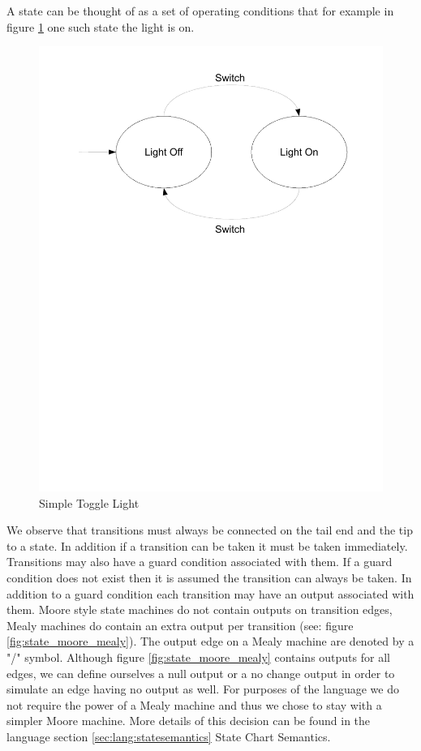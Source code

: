 A state can be thought of as a set of operating conditions that for example in figure \ref{fig:state_blink_light}
one such state the light is on.

\begin{figure}[htp]
    \centering
    \includegraphics[trim= 10mm 150mm 10mm 10mm, clip, width=\imgmedium]{./images/state_blink_light.pdf}
    \caption{Simple Toggle Light}
    \label{fig:state_blink_light}
\end{figure}

We observe that transitions must always be connected on the tail end and the tip to a state. In addition if a transition can be taken it must be taken immediately. Transitions may also have a guard condition associated with them. If a guard condition does not exist then it is assumed the transition can always be taken. In addition to a guard condition each transition may have an output associated with them. Moore style state machines do not contain outputs on transition edges, Mealy machines do contain an extra output per transition (see: figure \ref{fig:state_moore_mealy}). The output edge on a Mealy machine are denoted by a "/" symbol. Although figure \ref{fig:state_moore_mealy} contains outputs for all edges, we can define ourselves a null output or a no change output in order to simulate an edge having no output as well. For purposes of the \plccharts language we do not require the power of a Mealy machine and thus we chose to stay with a simpler Moore machine. More details of this decision can be found in the language section \ref{sec:lang:statesemantics} State Chart Semantics.

